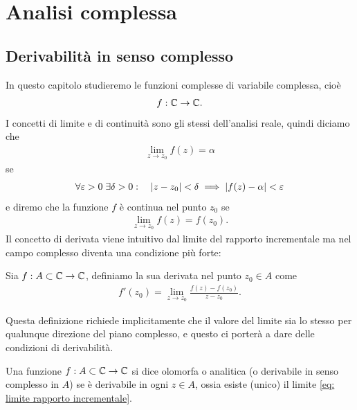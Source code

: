 \def \titolo {Metodi matematici 2}




\frontmatter
\maketitle
\tableofcontents
\cleardoublepage
\markboth{}{}
\mainmatter

\chapter{Analisi complessa}
\section{Derivabilità in senso complesso}
In questo capitolo studieremo le funzioni complesse di variabile complessa, cioè
\begin{align}
  f:\mathbb{C} \to \mathbb{C}.
\end{align}
I concetti di limite e di continuità sono gli stessi dell'analisi reale, quindi diciamo che 
\begin{align}
  \lim_{z\to z_0} f(z) = \alpha
\end{align}
se
\begin{align}
  \forall\varepsilon > 0\; \exists \delta > 0: \quad |z - z_0| < \delta \implies |f(z) - \alpha| < \varepsilon
\end{align}
e diremo che la funzione $ f $ è continua nel punto $ z_0 $ se 
\begin{align}
  \lim_{z \to z_0 }f(z) = f(z_0).
\end{align}
Il concetto di derivata viene intuitivo dal limite del rapporto incrementale ma nel campo complesso diventa una condizione più forte:
\begin{definition}
  Sia $ f: A \subset \mathbb{C} \to \mathbb{C} $, definiamo la sua derivata nel punto $ z_0 \in A $ come 
  \begin{align} \label{eq: limite rapporto incrementale}
    f'(z_0) = \lim_{z \to z_0} \frac{f(z) - f(z_0)}{z - z_0}.
  \end{align}
\end{definition}
Questa definizione richiede implicitamente che il valore del limite sia lo stesso per qualunque direzione del piano complesso, e questo 
ci porterà a dare delle condizioni di derivabilità. 
\begin{definition}
  Una funzione $ f: A \subset \mathbb{C} \to \mathbb{C} $ si dice olomorfa o analitica (o derivabile in senso complesso in $ A $) se è derivabile in ogni $ z \in A $, 
  ossia esiste (unico) il limite \eqref{eq: limite rapporto incrementale}.
\end{definition}

